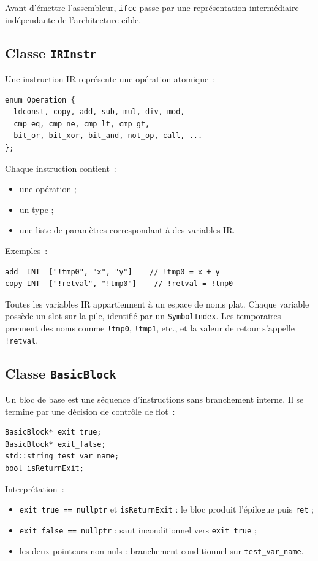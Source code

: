\documentclass[11pt,a4paper]{article}
\begin{document}
Avant d'émettre l'assembleur, \texttt{ifcc} passe par une représentation intermédiaire indépendante de l'architecture cible.

\subsection{Classe \texttt{IRInstr}}

Une instruction IR représente une opération atomique~:

\begin{lstlisting}
enum Operation {
  ldconst, copy, add, sub, mul, div, mod,
  cmp_eq, cmp_ne, cmp_lt, cmp_gt,
  bit_or, bit_xor, bit_and, not_op, call, ...
};
\end{lstlisting}

Chaque instruction contient~:
\begin{itemize}
  \item une opération ;
  \item un type ;
  \item une liste de paramètres correspondant à des variables IR.
\end{itemize}

Exemples~:

\begin{lstlisting}
add  INT  ["!tmp0", "x", "y"]    // !tmp0 = x + y
copy INT  ["!retval", "!tmp0"]    // !retval = !tmp0
\end{lstlisting}

Toutes les variables IR appartiennent à un espace de noms plat. Chaque variable possède un slot sur la pile, identifié par un \texttt{SymbolIndex}. Les temporaires prennent des noms comme \texttt{!tmp0}, \texttt{!tmp1}, etc., et la valeur de retour s'appelle \texttt{!retval}.

\subsection{Classe \texttt{BasicBlock}}

Un bloc de base est une séquence d'instructions sans branchement interne. Il se termine par une décision de contrôle de flot~:

\begin{lstlisting}
BasicBlock* exit_true;
BasicBlock* exit_false;
std::string test_var_name;
bool isReturnExit;
\end{lstlisting}

Interprétation~:
\begin{itemize}
  \item \texttt{exit\_true == nullptr} et \texttt{isReturnExit} : le bloc produit l'épilogue puis \texttt{ret} ;
  \item \texttt{exit\_false == nullptr} : saut inconditionnel vers \texttt{exit\_true} ;
  \item les deux pointeurs non nuls : branchement conditionnel sur \texttt{test\_var\_name}.
\end{itemize}
\end{document}
